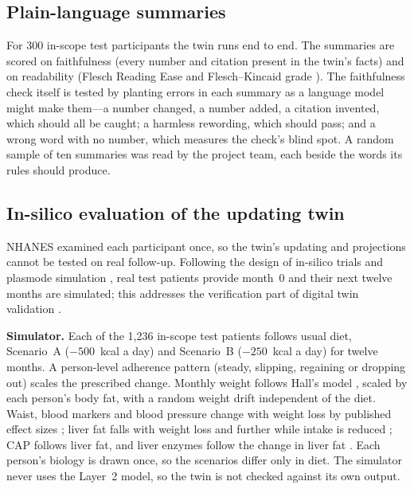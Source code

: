 \subsection{Plain-language summaries}

For 300 in-scope test participants the twin runs end to end. The summaries
are scored on faithfulness (every number and citation present in the twin's
facts) and on readability (Flesch Reading Ease and Flesch--Kincaid grade
\cite{flesch1948readability}). The faithfulness check itself is tested by
planting errors in each summary as a language model might make them---a
number changed, a number added, a citation invented, which should all be
caught; a harmless rewording, which should pass; and a wrong word with no
number, which measures the check's blind spot. A random sample of ten
summaries was read by the project team, each beside the words its rules should
produce.

\subsection{In-silico evaluation of the updating twin}

NHANES examined each participant once, so the twin's updating and projections
cannot be tested on real follow-up. Following the design of in-silico trials
\cite{pappalardo2019insilico} and plasmode simulation
\cite{franklin2014plasmode}, real test patients provide month~0 and their next
twelve months are simulated; this addresses the verification part of digital
twin validation \cite{nasem2024digitaltwins}.

\textbf{Simulator.} Each of the 1{,}236 in-scope test patients follows usual
diet, Scenario~A ($-500$~kcal a day) and Scenario~B ($-250$~kcal a day) for
twelve months. A person-level adherence pattern (steady, slipping, regaining
or dropping out) scales the prescribed change. Monthly weight follows Hall's
model \cite{hall2011energy}, scaled by each person's body fat, with a random
weight drift independent of the diet. Waist, blood markers and blood pressure
change with weight loss by published effect sizes \cite{wing2011modest};
liver fat falls with weight loss and further while intake is reduced
\cite{lim2011reversal}; CAP follows liver fat, and liver enzymes follow the
change in liver fat \cite{koutoukidis2019weightloss,wong2013community}. Each
person's biology is drawn once, so the scenarios differ only in diet. The
simulator never uses the Layer~2 model, so the twin is not checked against its
own output.

